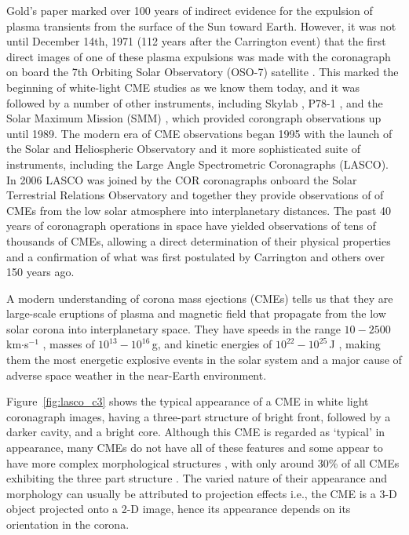Gold's paper marked over 100 years of indirect evidence for the expulsion of plasma transients from the surface of the Sun toward Earth. However, it was not until December 14th, 1971 (112 years after the Carrington event) that the first direct images of one of these plasma expulsions was made with the coronagraph on board the 7th Orbiting Solar Observatory (OSO-7) satellite \citep{tousey1971}. This marked the beginning of white-light CME studies as we know them today, and it was followed by a number of other instruments, including Skylab \citep{macqueen1980}, P78-1 \citep{sheeley1980}, and the Solar Maximum Mission (SMM) \citep{hundhausen1999}, which provided corongraph observations up until 1989. The modern era of CME observations began 1995 with the launch of the Solar and Heliospheric Observatory \citep[\emph{SOHO};][]{dom95} and it more sophisticated suite of instruments, including the Large Angle Spectrometric Coronagraphs (LASCO). In 2006 LASCO was joined by the COR coronagraphs onboard the Solar Terrestrial Relations Observatory \citep[\emph{STEREO};][]{kai08} and together they provide observations of of CMEs from the low solar atmosphere into interplanetary distances. The past 40 years of coronagraph operations in space have yielded observations of tens of thousands of CMEs, allowing a direct determination of their physical properties and a confirmation of what was first postulated by Carrington and others over 150 years ago.

A modern understanding of corona mass ejections (CMEs) tells us that they are large-scale eruptions of plasma and magnetic field that propagate from the low solar corona into interplanetary space. They have speeds in the range $10-2500$\,km$\cdot$s$^{-1}$ \citep{gopal2004}, masses of $10^{13}-10^{16}$\,g, and kinetic energies of $10^{22} - 10^{25}$\,J \citep{vour2010}, making them the most energetic explosive events in the solar system and a major cause of adverse space weather in the near-Earth environment. 

Figure~\ref{fig:lasco_c3} shows the typical appearance of a CME in white light coronagraph images, having a three-part structure of bright front, followed by a darker cavity, and a bright core. Although this CME is regarded as \textquoteleft typical' in appearance, many CMEs do not have all of these features and some appear to have more complex morphological structures \citep{pick2006}, with only around 30\% of all CMEs exhibiting the three part structure \citep{webbHu1987}. The varied nature of their appearance and morphology can usually be attributed to projection effects i.e., the CME is a 3-D object projected onto a 2-D image, hence its appearance depends on its orientation in the corona.

